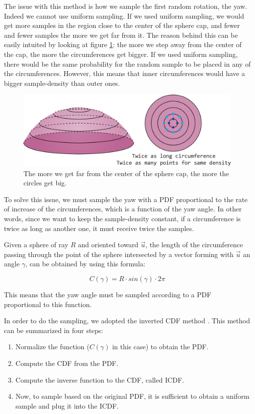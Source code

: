 \documentclass{PoliMi_MasterThesis}
\begin{document}
The issue with this method is how we sample the first random rotation, the yaw. Indeed we cannot use uniform sampling. If we used uniform sampling, we would get more samples in the region close to the center of the sphere cap, and fewer and fewer samples the more we get far from it. The reason behind this can be easily intuited by looking at figure \ref{fig:concentric_circles}: the more we step away from the center of the cap, the more the circumferences get bigger. If we used uniform sampling, there would be the same probability for the random sample to be placed in any of the circumferences. However, this means that inner circumferences would have a bigger sample-density than outer ones.

\begin{figure}[H]
    \centering
    \includegraphics[width=\textwidth*\real{0.65}]{Images/sphere_cap_density.png} 
    \caption{The more we get far from the center of the sphere cap, the more the circles get big.}
    \label{fig:concentric_circles}
\end{figure}

To solve this issue, we must sample the yaw with a PDF proportional to the rate of increase of the circumferences, which is a function of the yaw angle. In other words, since we want to keep the sample-density constant, if a circumference is twice as long as another one, it must receive twice the samples.

Given a sphere of ray $R$ and oriented toward $\overrightarrow{u}$, the length of the circumference passing through the point of the sphere intersected by a vector forming with $\overrightarrow{u}$ an angle $\gamma$, can be obtained by using this formula:

$$C(\gamma) = R \cdot sin(\gamma) \cdot 2\pi$$

This means that the yaw angle must be sampled according to a PDF proportional to this function.

In order to do the sampling, we adopted the inverted CDF method \cite{inverse_cdf}. This method can be summarized in four steps:
\begin{enumerate}
	\item Normalize the function ($C(\gamma)$ in this case) to obtain the PDF.
	\item Compute the CDF from the PDF.
	\item Compute the inverse function to the CDF, called ICDF.
	\item Now, to sample based on the original PDF, it is sufficient to obtain a uniform sample and plug it into the ICDF.
\end{enumerate}
\end{document}
